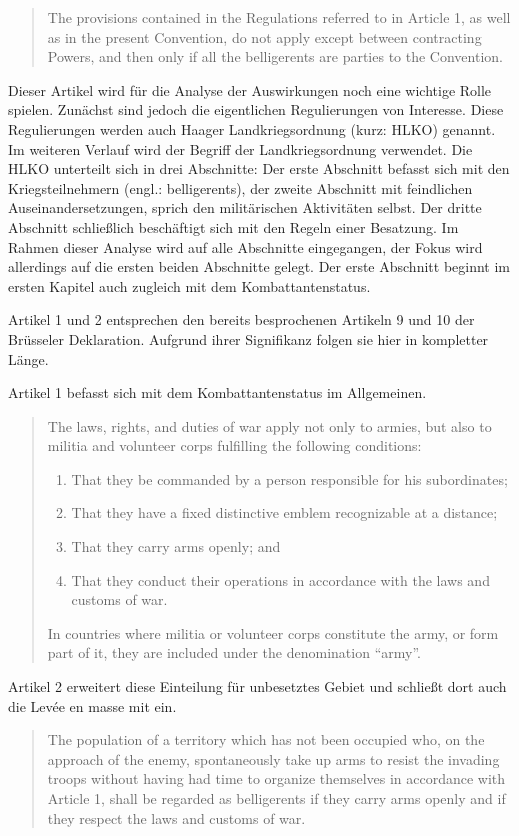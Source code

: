 \documentclass[12pt]{scrartcl}
\begin{document}
\begin{quotation}
	The provisions contained in the Regulations referred to in Article 1, as well as in the present Convention, do not apply except between contracting Powers, and then only if all the belligerents are parties to the Convention.
\end{quotation}

Dieser Artikel wird für die Analyse der Auswirkungen noch eine wichtige Rolle spielen. Zunächst sind jedoch die eigentlichen Regulierungen von Interesse. Diese Regulierungen werden auch Haager Landkriegsordnung (kurz: HLKO) genannt. Im weiteren Verlauf wird der Begriff der Landkriegsordnung verwendet. Die HLKO unterteilt sich in drei Abschnitte: Der erste Abschnitt befasst sich mit den Kriegsteilnehmern (engl.: belligerents), der zweite Abschnitt mit feindlichen Auseinandersetzungen, sprich den militärischen Aktivitäten selbst. Der dritte Abschnitt schließlich beschäftigt sich mit den Regeln einer Besatzung. Im Rahmen dieser Analyse wird auf alle Abschnitte eingegangen, der Fokus wird allerdings auf die ersten beiden Abschnitte gelegt. Der erste Abschnitt beginnt im ersten Kapitel auch zugleich mit dem Kombattantenstatus. 

Artikel 1 und 2 entsprechen den bereits besprochenen Artikeln 9 und 10 der Brüsseler Deklaration. Aufgrund ihrer Signifikanz folgen sie hier in kompletter Länge.

Artikel 1 befasst sich mit dem Kombattantenstatus im Allgemeinen.
\begin{quotation}
	The laws, rights, and duties of war apply not only to armies, but also to militia and volunteer corps fulfilling the following conditions:
\begin{enumerate}
\item That they be commanded by a person responsible for his subordinates;
\item That they have a fixed distinctive emblem recognizable at a distance;
\item That they carry arms openly; and
\item That they conduct their operations in accordance with the laws and customs of war.
\end{enumerate}
In countries where militia or volunteer corps constitute the army, or form part of it, they are included under the denomination  ``army''.
\end{quotation}

Artikel 2 erweitert diese Einteilung für unbesetztes Gebiet und schließt dort auch die Levée en masse mit ein.
\begin{quotation}
	The population of a territory which has not been occupied who, on the
approach of the enemy, spontaneously take up arms to resist the invading troops
without having had time to organize themselves in accordance with Article 1,
shall be regarded as belligerents if they carry arms openly and if they respect
the laws and customs of war.
\end{quotation}
\end{document}
